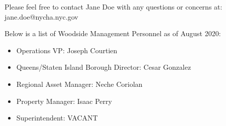{    Please feel free to contact Jane Doe with any questions or concerns at: jane.doe@nycha.nyc.gov

    Below is a list of Woodside Management Personnel as of August 2020:
    \begin{itemize}
    \item Operations VP: Joseph Courtien
    \item Queens/Staten Island Borough Director: Cesar Gonzalez
    \item Regional Asset Manager: Neche Coriolan
    \item Property Manager: Isaac Perry
    \item Superintendent: VACANT
    \end{itemize}
    }
